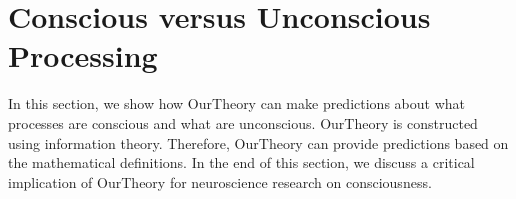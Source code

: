 \documentclass[utf8]{article}
\begin{document}
    
    
	\section{Conscious versus Unconscious Processing}\label{sec:Conscious versus Unconscious Processing}
	    In this section, we show how \ac{OurTheory} can make predictions about what processes are conscious and what are unconscious. \ac{OurTheory} is constructed using information theory. Therefore, \ac{OurTheory} can provide predictions based on the mathematical definitions. In the end of this section, we discuss a critical implication of \ac{OurTheory} for neuroscience research on consciousness.  
	    
	    
\end{document}
